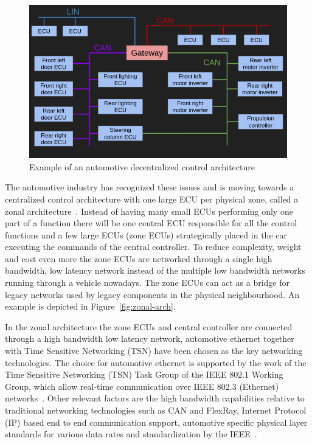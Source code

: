 \begin{figure}[htb]
    \centering
    \includegraphics[width=\textwidth]{images/functional-arch.png}
    \caption{Example of an automotive decentralized control architecture}
    \label{fig:functional-arch}
\end{figure}

The automotive industry has recognized these issues and is moving towards a centralized control architecture with one large ECU per physical zone, called a zonal architecture~\cite{ashjaei2021time}. Instead of having many small ECUs performing only one part of a function there will be one central ECU responsible for all the control functions and a few large ECUs (zone ECUs) strategically placed in the car executing the commands of the central controller. To reduce complexity, weight and cost even more the zone ECUs are networked through a single high bandwidth, low latency network instead of the multiple low bandwidth networks running through a vehicle nowadays. The zone ECUs can act as a bridge for legacy networks used by legacy components in the physical neighbourhood. An example is depicted in Figure~\ref{fig:zonal-arch}.

In the zonal architecture the zone ECUs and central controller are connected through a high bandwidth low latency network, automotive ethernet together with Time Sensitive Networking (TSN) have been chosen as the key networking technologies. The choice for automotive ethernet is supported by the work of the Time Sensitive Networking (TSN) Task Group of the IEEE 802.1 Working Group, which allow real-time communication over IEEE 802.3 (Ethernet) networks~\cite{klaus2019zonal}. Other relevant factors are the high bandwidth capabilities relative to traditional networking technologies such as CAN and FlexRay, Internet Protocol (IP) based end to end communication support, automotive specific physical layer standards for various data rates and standardization by the IEEE~\cite{ashjaei2021time}.

